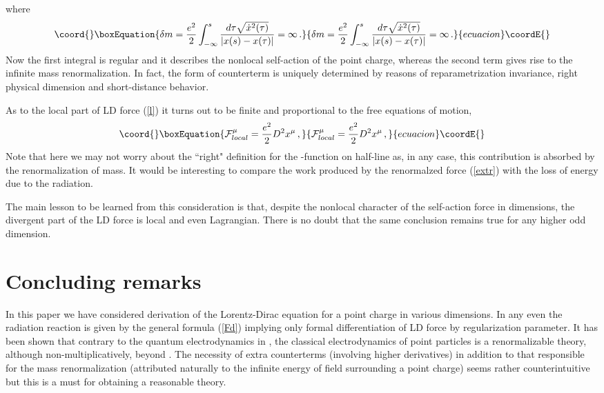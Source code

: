 \documentclass[a4paper,12pt]{article}
\begin{document}
where
\begin{equation}\coord{}\boxEquation{
\delta m=\frac {e^2}2\int_{-\infty}^s \frac{d\tau \sqrt{\dot{x}^2(\tau )}}{
|x(s)-x(\tau )|}=\infty\,.
}{
\delta m=\frac {e^2}2\int_{-\infty}^s \frac{d\tau \sqrt{\dot{x}^2(\tau )}}{
|x(s)-x(\tau )|}=\infty\,.
}{ecuacion}\coordE{}\end{equation}
Now the first integral is regular and it describes the nonlocal self-action
of the point charge, whereas the second term gives rise to the infinite mass
renormalization. In fact, the form of counterterm is uniquely determined by
reasons of reparametrization invariance, right physical dimension and
short-distance behavior.

As to the local part of LD force (\ref{l}) it turns out to be finite and
proportional to the free equations of motion,
\begin{equation}\coord{}\boxEquation{
{\cal F}_{local}^\mu=\frac{e^2}2D^2x^\mu\,,
}{
{\cal F}_{local}^\mu=\frac{e^2}2D^2x^\mu\,,
}{ecuacion}\coordE{}\end{equation}
Note that here we may not worry about the ``right" definition for the \myHighlight{$%
\delta $}\coordHE{}-function on half-line as, in any case, this contribution is
absorbed by the renormalization of mass. It would be interesting to compare
the work produced by the renormalzed force (\ref{extr}) with the loss of
energy due to the radiation.

The main lesson to be learned from this consideration is that, despite the
nonlocal character of the self-action force in \coordHE{} dimensions, the
divergent part of the LD force is local and even Lagrangian. There is no
doubt that the same conclusion remains true for any higher odd dimension.

\section{ Concluding remarks}

In this paper we have considered derivation of the Lorentz-Dirac
equation for a point charge in various dimensions.
In any even \coordHE{}
the radiation reaction is given by the general formula (\ref{Fd})
implying only formal differentiation of \coordHE{} LD force by
regularization parameter.  It has been shown that contrary to the
quantum electrodynamics in \coordHE{}, the classical electrodynamics of
point particles is a renormalizable theory, although
non-multiplicatively, beyond \coordHE{}. The necessity of extra
counterterms (involving higher derivatives) in addition to that
responsible for the mass renormalization (attributed naturally to the
infinite energy of field surrounding a point charge) seems rather
counterintuitive but this is a must for obtaining a reasonable
theory.
\end{document}
